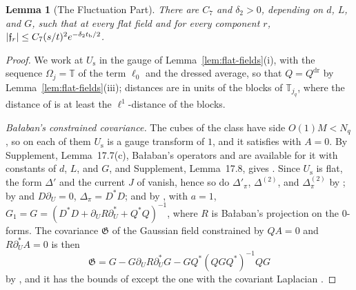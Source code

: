 \documentclass[11pt]{preprint}
\DeclarePairedDelimiter{\abs}{\lvert}{\rvert}
\numberwithin{equation}{section}
\newtheorem{lemma}[theorem]{Lemma}
\theoremstyle{definition}
\theoremstyle{remark}
\theoremstyle{plain}
\begin{document}
\begin{lemma}[The Fluctuation Part]\label{lem:fluctuation-part}
There are $C_7$ and $\delta_2 > 0$, depending on $d$, $L$, and $G$, such that at every flat field and for every component $r$, $\abs{\mathfrak f_r} \leq C_7(s/t)^2e^{-\delta_2t_{\mathrm b}/2}$.
\end{lemma}

\begin{proof}
We work at $U_{\mathrm s}$ in the gauge of Lemma~\ref{lem:flat-fields}(i), with the sequence $\Omega_j = \mathbb T$ of the term $\ell_0$ and the dressed average, so that $Q = Q^{\mathrm{dr}}$ by Lemma~\ref{lem:flat-fields}(iii); distances are in units of the blocks of $\mathbb T_{j_q}$, where the distance of \cite[(2.46), p.~231]{BalabanPRT2} is at least the $\ell^1$-distance of the blocks.

\emph{Ba{\l}aban's constrained covariance.} The cubes of the class \cite[(3.35), p.~396]{BalabanPBG} have side $O(1)M < N_q$, so on each of them $U_{\mathrm s}$ is a gauge transform of $1$, and it satisfies \cite[(3.35)--(3.36)]{BalabanPBG} with $A = 0$. By Supplement, Lemma~17.7(c), Ba{\l}aban's operators and \cite[Theorems~3.1, 3.3, 3.13]{BalabanPBG} are available for it with constants of $d$, $L$, and $G$, and Supplement, Lemma~17.8, gives \cite[(3.132), p.~422]{BalabanPBG}. Since $U_{\mathrm s}$ is flat, the form $\Delta'$ and the current $J$ of \cite[(3.10)--(3.11), p.~392]{BalabanPBG} vanish, hence so do $\Delta'_\pi$, $\Delta^{(2)}$, and $\Delta^{(2)}_\pi$ by \cite[(3.120), (3.134), (3.135), pp.~419--422]{BalabanPBG}; by \cite[(3.119)]{BalabanPBG} and $D\partial_U = 0$, $\Delta_\pi = D^*D$; and by \cite[(3.122), (3.128)]{BalabanPBG}, with $a = 1$, $G_1 = G = (D^*D + \partial_UR\partial_U^* + Q^*Q)^{-1}$, where $R$ is Ba{\l}aban's projection on the $0$-forms. The covariance $\mathfrak G$ of the Gaussian field constrained by $QA = 0$ and $R\partial_U^*A = 0$ \cite[(3.148), p.~425]{BalabanPBG} is then
\begin{equation}\label{eq:constrained-covariance}
    \mathfrak G = G - G\partial_UR\partial_U^*G - GQ^*(QGQ^*)^{-1}QG
\end{equation}
by \cite[(3.153), p.~426]{BalabanPBG}, and it has the bounds of \cite[Theorem~3.3]{BalabanPBG} except the one with the covariant Laplacian \cite[Theorem~3.13, p.~426]{BalabanPBG}.


\end{proof}
\end{document}
